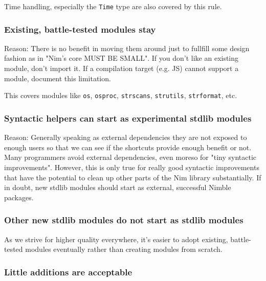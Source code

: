 Time handling, especially the \texttt{Time} type are also covered by
this rule.

\hypertarget{existing-battle-tested-modules-stay}{%
\subsubsection{Existing, battle-tested modules
stay}\label{existing-battle-tested-modules-stay}}

Reason: There is no benefit in moving them around just to fullfill some
design fashion as in "Nim's core MUST BE SMALL". If you don't like an
existing module, don't import it. If a compilation target (e.g. JS)
cannot support a module, document this limitation.

This covers modules like \texttt{os}, \texttt{osproc},
\texttt{strscans}, \texttt{strutils}, \texttt{strformat}, etc.

\hypertarget{syntactic-helpers-can-start-as-experimental-stdlib-modules}{%
\subsubsection{Syntactic helpers can start as experimental stdlib
modules}\label{syntactic-helpers-can-start-as-experimental-stdlib-modules}}

Reason: Generally speaking as external dependencies they are not exposed
to enough users so that we can see if the shortcuts provide enough
benefit or not. Many programmers avoid external dependencies, even
moreso for "tiny syntactic improvements". However, this is only true for
really good syntactic improvements that have the potential to clean up
other parts of the Nim library substantially. If in doubt, new stdlib
modules should start as external, successful Nimble packages.

\hypertarget{other-new-stdlib-modules-do-not-start-as-stdlib-modules}{%
\subsubsection{Other new stdlib modules do not start as stdlib
modules}\label{other-new-stdlib-modules-do-not-start-as-stdlib-modules}}

As we strive for higher quality everywhere, it's easier to adopt
existing, battle-tested modules eventually rather than creating modules
from scratch.

\hypertarget{little-additions-are-acceptable}{%
\subsubsection{Little additions are
acceptable}\label{little-additions-are-acceptable}}

